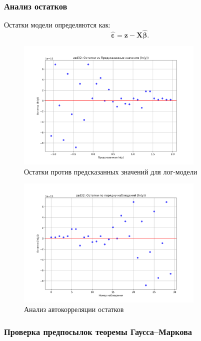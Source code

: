 \subsubsection{Анализ остатков}

Остатки модели определяются как:
\begin{equation}
    \hat{\boldsymbol{\varepsilon}} = \mathbf{z} - \mathbf{X} \hat{\boldsymbol{\beta}}.
\end{equation}


\begin{figure}[H]
\centering
\includegraphics[width=0.8\textwidth]{fig/zad32_residuals_vs_predicted.png}
\caption{Остатки против предсказанных значений для лог-модели}
\label{fig:zad32_residuals_vs_predicted}
\end{figure}


\begin{figure}[H]
\centering
\includegraphics[width=0.8\textwidth]{fig/zad32_residuals_order.png}
\caption{Анализ автокорреляции остатков}
\label{fig:zad32_residuals_order}
\end{figure}

\subsubsection{Проверка предпосылок теоремы Гаусса–Маркова}

